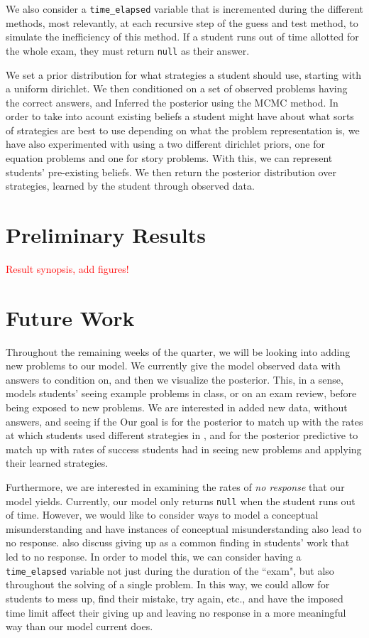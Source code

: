 \documentclass[10pt,letterpaper]{article}
\newcommand\TODO[1]{\textcolor{red}{#1}}
\begin{document}
We also consider a \verb|time_elapsed| variable that is incremented during the different methods, most relevantly, at each recursive step of the guess and test method, to simulate the inefficiency of this method. If a student runs out of time allotted for the whole exam, they must return \verb|null| as their answer.

We set a prior distribution for what strategies a student should use, starting with a uniform dirichlet. We then conditioned on a set of observed problems having the correct answers, and Inferred the posterior using the MCMC method. In order to take into acount existing beliefs a student might have about what sorts of strategies are best to use depending on what the problem representation is, we have also experimented with using a two different dirichlet priors, one for equation problems and one for story problems. With this, we can represent students' pre-existing beliefs. We then return the posterior distribution over strategies, learned by the student through observed data.



\section{Preliminary Results}
\TODO{Result synopsis, add figures!}

\section{Future Work}
Throughout the remaining weeks of the quarter, we will be looking into adding new problems to our model. We currently give the model observed data with answers to condition on, and then we visualize the posterior. This, in a sense, models students' seeing example problems in class, or on an exam review, before being exposed to new problems. We are interested in added new data, without answers, and seeing if the 
Our goal is for the posterior to match up with the rates at which students used different strategies in \cite{KoedNath2004, KoedNath2008}, and for the posterior predictive to match up with rates of success students had in seeing new problems and applying their learned strategies. 

Furthermore, we are interested in examining the rates of \textit{no response} that our model yields. Currently, our model only returns \verb|null| when the student runs out of time. However, we would like to consider ways to model a conceptual misunderstanding and have instances of conceptual misunderstanding also lead to no response.  also discuss giving up as a common finding in students' work that led to no response. In order to model this, we can consider having a \verb|time_elapsed| variable not just during the duration of the ``exam", but also throughout the solving of a single problem. In this way, we could allow for students to mess up, find their mistake, try again, etc., and have the imposed time limit affect their giving up and leaving no response in a more meaningful way than our model current does.
\end{document}
